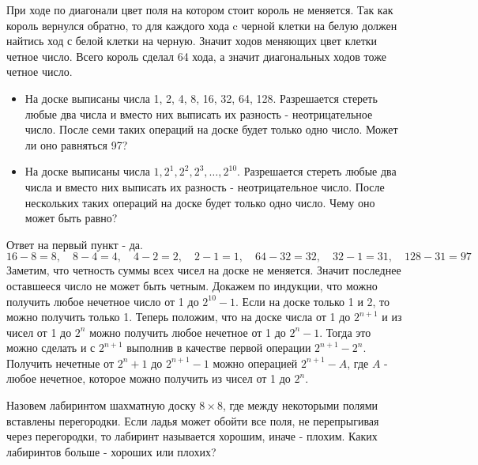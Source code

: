 \documentclass[11pt, a4paper]{common/document_template}
\begin{document}
\begin{Solution}
При ходе по диагонали цвет поля на котором стоит король не меняется. Так как король вернулся обратно, то для каждого хода c черной клетки на белую должен найтись ход с белой клетки на черную. Значит ходов меняющих цвет клетки четное число. Всего король сделал 64 хода, а значит диагональных ходов тоже четное число. 
\end{Solution}

\begin{exercise}
\begin{itemize}
\item На доске выписаны числа 1, 2, 4, 8, 16, 32, 64, 128. Разрешается стереть любые два числа и вместо них выписать их разность - неотрицательное число. После семи таких операций на доске будет только одно число. Может ли оно равняться 97?
\item На доске выписаны числа $1, 2^{1}, 2^{2}, 2^{3}, \dots, 2^{10}$. Разрешается стереть любые два числа и вместо них выписать их разность - неотрицательное число. После нескольких таких операций на доске будет только одно число. Чему оно может быть равно?
\end{itemize}
\end{exercise}

\begin{Solution}
Ответ на первый пункт - да. 
$$
16 - 8 = 8, \quad 8 - 4 = 4, \quad 4 - 2 = 2, \quad 2 - 1 = 1, \quad 
64 - 32 = 32, \quad 32 - 1 = 31, \quad 128 - 31 = 97
$$
Заметим, что четность суммы всех чисел на доске не меняется. Значит последнее оставшееся число не может быть четным. Докажем по индукции, что можно получить любое нечетное число от 1 до $2^{10} - 1$. Если на доске только 1 и 2, то можно получить только 1. Теперь положим, что на доске числа от 1 до $2^{n+1}$ и из чисел от 1 до $2^{n}$ можно получить любое нечетное от 1 до $2^{n} - 1$. Тогда это можно сделать и с $2^{n+1}$ выполнив в качестве первой операции $2^{n+1} - 2^{n}$. Получить нечетные от $2^{n} + 1$ до $2^{n+1} - 1$ можно операцией $2^{n+1} - A$, где $A$ - любое нечетное, которое можно получить из чисел от 1 до $2^{n}$.
\end{Solution}

\begin{exercise}
Назовем лабиринтом шахматную доску $8 \times 8$, где между некоторыми полями вставлены перегородки. Если ладья может обойти все поля, не перепрыгивая через перегородки, то лабиринт называется хорошим, иначе - плохим. Каких лабиринтов больше - хороших или плохих?
\end{exercise}
\end{document}
